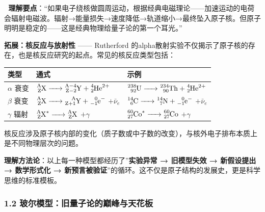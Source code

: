 \documentclass[a4paper,11pt]{ctexart}
\newcounter{none}
\begin{document}
📌 \textbf{理解要点}：``如果电子绕核做圆周运动，根据经典电磁理论------加速运动的电荷会辐射电磁波。辐射→能量损失→速度降低→轨道缩小→最终坠入原子核。但原子明明是稳定的------这是经典物理给量子论的第一个耳光。''

\textbf{拓展：核反应与放射性} ------ Rutherford 的alpha散射实验不仅揭示了原子核的存在，也是核反应研究的起点。常见的核反应类型包括：

{\def\LTcaptype{none} %
\begin{longtable}[]{@{}
  >{\raggedright\arraybackslash}p{}
  >{\raggedright\arraybackslash}p{}
  >{\raggedright\arraybackslash}p{}@{}}
\toprule\noalign{}
\begin{minipage}[b]{\linewidth}\raggedright
类型
\end{minipage} & \begin{minipage}[b]{\linewidth}\raggedright
通式
\end{minipage} & \begin{minipage}[b]{\linewidth}\raggedright
示例
\end{minipage} \\
\midrule\noalign{}
\endhead
\bottomrule\noalign{}
\endlastfoot
\(\alpha\) 衰变 & \(\ce{^{A}_{Z}X -> ^{A-4}_{Z-2}Y + ^{4}_{2}He^{2+}}\) & \(\ce{^{238}_{92}U -> ^{234}_{90}Th + ^{4}_{2}He^{2+}}\) \\
\(\beta\) 衰变 & \(\ce{^{A}_{Z}X -> ^{A}_{Z+1}Y + ^{0}_{-1}e^{-}}\) \(+ \bar{\nu}_e\) & \(\ce{^{14}_{6}C -> ^{14}_{7}N + ^{0}_{-1}e^{-}}\) \(+ \bar{\nu}_e\) \\
\(\gamma\) 辐射 & \(\ce{^{A}_{Z}X^{*} -> ^{A}_{Z}X}\) \(+ \gamma\) & \(\ce{^{60}_{27}Co^{*} -> ^{60}_{27}Co}\) \(+ \gamma\) \\
\end{longtable}
}

核反应涉及原子核内部的变化（质子数或中子数的改变），与核外电子排布本质上是不同物理层次的问题。

\textbf{理解方法论}：以上每一种模型都经历了''\textbf{实验异常 → 旧模型失效 → 新假设提出 → 数学形式化 → 新预言被验证}''的循环。这不仅是原子结构的发展史，更是科学思维的标准模板。

\subsubsection{1.2 玻尔模型：旧量子论的巅峰与天花板}\label{ux73bbux5c14ux6a21ux578bux65e7ux91cfux5b50ux8bbaux7684ux5dc5ux5cf0ux4e0eux5929ux82b1ux677f}
\end{document}
